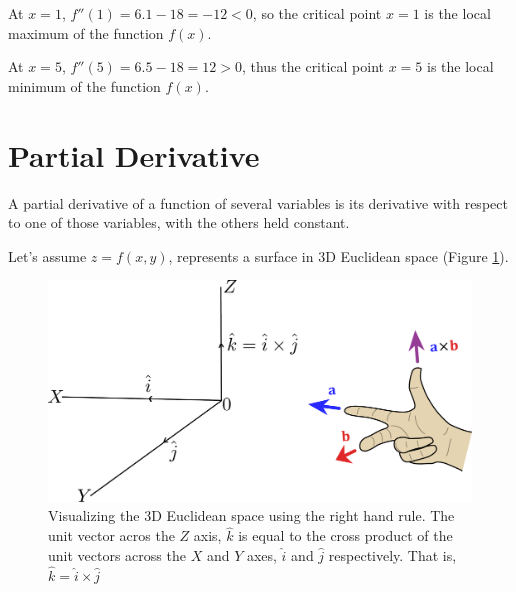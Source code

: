 \documentclass[conference,final,11pt,technote,onecolumn]{IEEEtran}\usepackage[]{graphicx}\usepackage[]{color}
\begin{document}
 At $x=1$, $f''(1) = 6.1-18=-12 < 0$, so the critical point $x=1$ is the local maximum of the function $f(x)$.
 
 At $x=5$, $f''(5) = 6.5-18=12 > 0$, thus the critical point $x=5$ is the local minimum of the function $f(x)$.
\section{Partial Derivative}
\label{term:partial_derivative}
A partial derivative of a function of several variables is its derivative with respect to one of those variables, with the others held constant\cite{wiki:PartialDerivative}\cite{khan:PartialDerivative}.

Let's assume $z = f(x,y)$, represents a surface in 3D Euclidean space (Figure \ref{fig:partial-derivative-1}).
\begin{figure}[!h]
	\centering
	\includegraphics[scale=0.5]{figures/partial-derivative-1.pdf}
	\caption{Visualizing the 3D Euclidean space using the right hand rule. The unit vector acros the $Z$ axis, $\hat{k}$ is equal to the cross product of the unit vectors across the $X$ and $Y$ axes, $\hat{i}$ and $\hat{j}$ respectively. That is, $\hat{k} = \hat{i}\times \hat{j}$\label{fig:partial-derivative-1}}
\end{figure}
\end{document}

